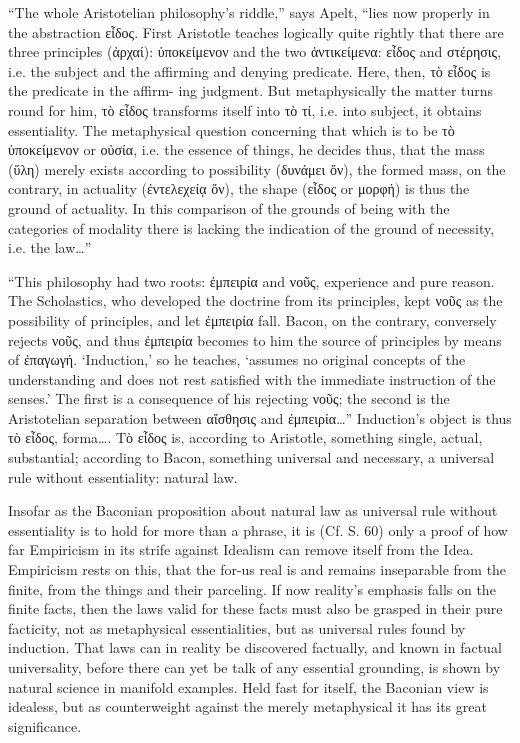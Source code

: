 \documentclass[12pt]{book}
\begin{document}
``The whole Aristotelian philosophy's riddle,'' says Apelt, ``lies now properly in the abstraction
εἶδος. First Aristotle teaches logically quite rightly that there are three principles (ἀρχαί):
ὑποκείμενον and the two ἀντικείμενα: εἶδος and στέρησις, i.e. the subject and the affirming and
denying predicate. Here, then, τὸ εἶδος is the predicate in the affirm-
ing judgment. But metaphysically the matter turns round for him, τὸ εἶδος transforms itself into τὸ τί,
i.e. into subject, it obtains essentiality. The metaphysical question concerning that which is to be τὸ
ὑποκείμενον or οὐσία, i.e. the essence of things, he decides thus, that the mass (ὕλη) merely exists
according to possibility (δυνάμει ὄν), the formed mass, on the contrary, in actuality (ἐντελεχείᾳ ὄν),
the shape (εἶδος or μορφή) is thus the ground of actuality. In this comparison of the grounds of being
with the categories of modality there is lacking the indication of the ground of necessity, i.e. the
law\ldots''

``This philosophy had two roots: ἐμπειρία and νοῦς, experience and pure reason. The Scholastics, who
developed the doctrine from its principles, kept νοῦς as the possibility of principles, and let ἐμπειρία
fall. Bacon, on the contrary, conversely rejects νοῦς, and thus ἐμπειρία becomes to him the source of
principles by means of ἐπαγωγή. `Induction,' so he teaches, `assumes no original concepts of the
understanding and does not rest satisfied with the immediate instruction of the senses.' The first is a
consequence of his rejecting νοῦς; the second is the Aristotelian separation between αἴσθησις and
ἐμπειρία\ldots'' Induction's object is thus τὸ εἶδος, forma\ldots. Τὸ εἶδος is, according to Aristotle,
something single, actual, substantial; according to Bacon, something universal and necessary, a
universal rule without essentiality: natural law.

Insofar as the Baconian proposition about natural law as universal rule without essentiality is to hold
for more than a phrase, it is (Cf. S. 60) only a proof of how far Empiricism in its strife against
Idealism can remove itself from the Idea. Empiricism rests on this, that the for-us real is and remains
inseparable from the finite, from the things and their parceling. If now reality's emphasis falls on
the finite facts, then the laws valid for these facts must also be grasped in their pure facticity,
not as metaphysical essentialities, but as universal rules found by induction. That laws can in reality
be discovered factually, and known in factual universality, before there can yet be talk of any
essential grounding, is shown by natural science in manifold examples. Held fast for itself, the
Baconian view is idealess, but as counterweight against the merely metaphysical it has its great
significance.
\end{document}
